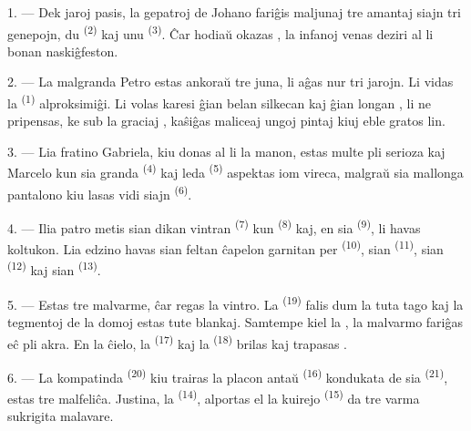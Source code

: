 \VUsaut{3.0mm}

1. --- Dek jaroj pasis, la gepatroj de Johano fariĝis maljunaj tre amantaj
siajn tri genepojn, du  \textsuperscript{(2)} kaj unu
 \textsuperscript{(3)}. Ĉar hodiaŭ okazas , la infanoj venas deziri al li bonan naskiĝfeston.

2. --- La malgranda Petro estas ankoraŭ tre juna, li aĝas nur tri jarojn. Li
vidas la  \textsuperscript{(1)} alproksimiĝi. Li volas karesi
ĝian belan  silkecan kaj ĝian longan , li ne
pripensas, ke sub la graciaj , kaŝiĝas maliceaj ungoj pintaj
kiuj eble gratos lin.

3. --- Lia fratino Gabriela, kiu donas al li la manon, estas multe pli serioza
kaj Marcelo kun sia granda  \textsuperscript{(4)} kaj leda
 \textsuperscript{(5)} aspektas iom vireca, malgraŭ sia mallonga
pantalono kiu lasas vidi siajn  \textsuperscript{(6)}.

4. --- Ilia patro metis sian dikan vintran 
\textsuperscript{(7)} kun  \textsuperscript{(8)} kaj, en sia
 \textsuperscript{(9)}, li havas koltukon. Lia edzino havas sian
feltan ĉapelon garnitan per  \textsuperscript{(10)}, sian
 \textsuperscript{(11)}, sian 
\textsuperscript{(12)} kaj sian  \textsuperscript{(13)}.

5. --- Estas tre malvarme, ĉar regas la vintro. La 
\textsuperscript{(19)} falis dum la tuta tago kaj la tegmentoj de la domoj
estas tute blankaj. Samtempe kiel la , la malvarmo fariĝas eĉ
pli akra. En la ĉielo, la  \textsuperscript{(17)} kaj la
 \textsuperscript{(18)} brilas kaj trapasas .

\VUsaut{4.2mm}
\VUsaut{3.0mm}

6. --- La kompatinda  \textsuperscript{(20)} kiu trairas la
placon antaŭ  \textsuperscript{(16)} kondukata de sia
 \textsuperscript{(21)}, estas tre malfeliĉa. Justina, la
 \textsuperscript{(14)}, alportas el la kuirejo
 \textsuperscript{(15)} da tre varma 
sukrigita malavare.

